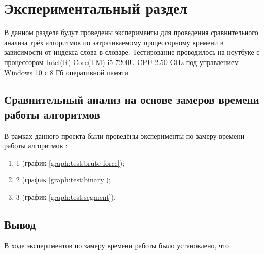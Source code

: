 \chapter{Экспериментальный раздел}
\label{cha:research}
    В данном разделе будут проведены эксперименты для проведения 
    сравнительного анализа трёх алгоритмов по затрачиваемому процессорному 
    времени в зависимости от индекса слова в словаре.
    Тестирование проводилось на ноутбуке с процессором
    Intel(R) Core(TM) i5-7200U CPU 2.50 GHz \cite{processor-i5-7200u}
    под управлением Windows 10 с 8 Гб оперативной памяти.

    \section{Сравнительный анализ на основе замеров времени работы алгоритмов}
        В рамках данного проекта были проведёны эксперименты
        по замеру времени работы алгоритмов :
        \begin{enumerate}
            \item 1 (график \ref{graph:test:brute-force});
            \item 2 (график \ref{graph:test:binary});
            \item 3 (график \ref{graph:test:segment}).
        \end{enumerate}

    \section{Вывод}
        В ходе экспериментов по замеру времени работы было установлено, что 
        

\newpage